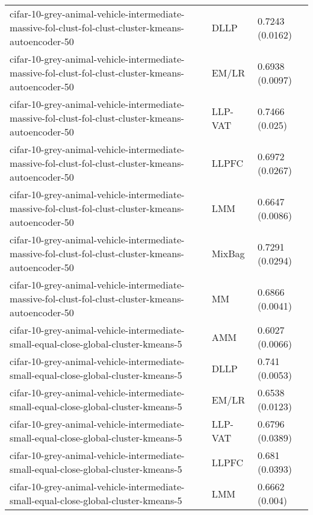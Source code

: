 \begin{longtable}{lll}
          cifar-10-grey-animal-vehicle-intermediate-massive-fol-clust-fol-clust-cluster-kmeans-autoencoder-50 &      DLLP &                       0.7243 (0.0162) \\
          cifar-10-grey-animal-vehicle-intermediate-massive-fol-clust-fol-clust-cluster-kmeans-autoencoder-50 &     EM/LR &                       0.6938 (0.0097) \\
          cifar-10-grey-animal-vehicle-intermediate-massive-fol-clust-fol-clust-cluster-kmeans-autoencoder-50 &   LLP-VAT &                        0.7466 (0.025) \\
          cifar-10-grey-animal-vehicle-intermediate-massive-fol-clust-fol-clust-cluster-kmeans-autoencoder-50 &     LLPFC &                       0.6972 (0.0267) \\
          cifar-10-grey-animal-vehicle-intermediate-massive-fol-clust-fol-clust-cluster-kmeans-autoencoder-50 &       LMM &                       0.6647 (0.0086) \\
          cifar-10-grey-animal-vehicle-intermediate-massive-fol-clust-fol-clust-cluster-kmeans-autoencoder-50 &    MixBag &                       0.7291 (0.0294) \\
          cifar-10-grey-animal-vehicle-intermediate-massive-fol-clust-fol-clust-cluster-kmeans-autoencoder-50 &        MM &                       0.6866 (0.0041) \\
                          cifar-10-grey-animal-vehicle-intermediate-small-equal-close-global-cluster-kmeans-5 &       AMM &                       0.6027 (0.0066) \\
                          cifar-10-grey-animal-vehicle-intermediate-small-equal-close-global-cluster-kmeans-5 &      DLLP &                        0.741 (0.0053) \\
                          cifar-10-grey-animal-vehicle-intermediate-small-equal-close-global-cluster-kmeans-5 &     EM/LR &                       0.6538 (0.0123) \\
                          cifar-10-grey-animal-vehicle-intermediate-small-equal-close-global-cluster-kmeans-5 &   LLP-VAT &                       0.6796 (0.0389) \\
                          cifar-10-grey-animal-vehicle-intermediate-small-equal-close-global-cluster-kmeans-5 &     LLPFC &                        0.681 (0.0393) \\
                          cifar-10-grey-animal-vehicle-intermediate-small-equal-close-global-cluster-kmeans-5 &       LMM &                        0.6662 (0.004) \\

\end{longtable}

